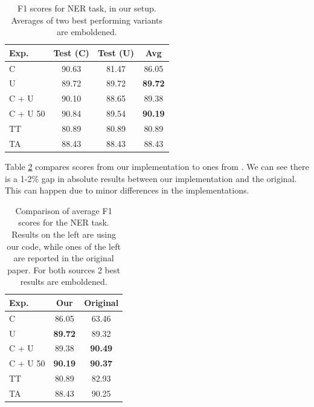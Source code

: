 \documentclass[11pt,a4paper]{article}
\begin{document}
    \begin{table}[h]
        \centering
        \begin{tabular}{|l|c|c|c|}
            \hline
            Exp. & Test (C) & Test (U) & Avg \\
            \hline
            C        & 90.63 & 81.47 & 86.05 \\
            U        & 89.72 & 89.72 & \textbf{89.72} \\
            C + U    & 90.10 & 88.65 & 89.38 \\
            C + U 50 & 90.84 & 89.54 & \textbf{90.19} \\
            TT       & 80.89 & 80.89 & 80.89 \\
            TA       & 88.43 & 88.43 & 88.43 \\
            \hline
        \end{tabular}
        \caption{F1 scores for NER task, in our setup. Averages of two best performing variants are emboldened.}
        \label{tab:ner-results-our}
    \end{table}

    Table \ref{tab:ner-results-comp} compares scores from our implementation to ones from \cite{ner-and-pos-original}. We can see there is a 1-2\% gap in absolute results between our implementation and the original. This can happen due to minor differences in the implementations.

    \begin{table}[h]
        \centering
        \begin{tabular}{|l|c|c|}
            \hline
            Exp. & Our & Original \\
            \hline
            C        & 86.05          & 63.46 \\
            U        & \textbf{89.72} & 89.32 \\
            C + U    & 89.38          & \textbf{90.49} \\
            C + U 50 & \textbf{90.19} & \textbf{90.37} \\
            TT       & 80.89          & 82.93 \\
            TA       & 88.43          & 90.25 \\
            \hline
        \end{tabular}
        \caption{Comparison of average F1 scores for the NER task. Results on the left are using our code, while ones of the left are reported in the original paper. For both sources 2 best results are emboldened.}
        \label{tab:ner-results-comp}
    \end{table}
\end{document}
